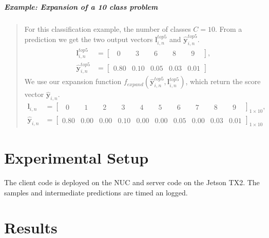 \subparagraph{Example: Expansion of a 10 class problem} 
\blockquote[]{	 	
	For this classification example, the number of classes $C=10$. From a prediction we get the two output vectors $\mathbf{l}_{i,n}^{top5}$ and $ \mathbf{\hat{y}}_{i,n}^{top5}$.
	\begin{align*}
	\mathbf{l}_{i,n}^{top5} &= \begin{bmatrix}
	\phantom{0}0\phantom{.0} & \phantom{0}3\phantom{.0} & \phantom{0}6\phantom{.0} & \phantom{0}8\phantom{.0} & \phantom{0}9\phantom{.0}
	\end{bmatrix},\\
	\mathbf{\hat{y}}_{i,n}^{top5} &= \begin{bmatrix}
	0.80 & 0.10 & 0.05 & 0.03 & 0.01
	\end{bmatrix}
	\end{align*}
	We use our expansion function $ f_{expand}\left(\bm{\hat{y}}_{i,n}^{top5},\mathbf{l}_{i,n}^{top5}\right) $, which return the score vector $ \mathbf{\hat{y}}_{i,n}$.
	\begin{align*}
	\mathbf{l}_{i,n} &= \begin{bmatrix}
	\phantom{0}0\phantom{.0} & \phantom{0}1\phantom{.0} & \phantom{0}2\phantom{.0} & \phantom{0}3\phantom{.0} & \phantom{0}4\phantom{.0} & \phantom{0}5\phantom{.0} & \phantom{0}6\phantom{.0} & \phantom{0}7\phantom{.0} & \phantom{0}8\phantom{.0} & \phantom{0}9\phantom{.0}
	\end{bmatrix}_{1 \times 10},\\
	\mathbf{\hat{y}}_{i,n}  &= \begin{bmatrix}
	0.80 & 0.00 & 0.00 & 0.10 & 0.00 & 0.00 & 0.05 & 0.00 & 0.03 & 0.01
	\end{bmatrix}_{1 \times 10}
	\end{align*}
}      

\section{Experimental Setup} \label{sec:edge-exp-setup}

The client code is deployed on the NUC and server code on the Jetson TX2. The samples and intermediate predictions are timed an logged. 

\section{Results} \label{sec:edge-results}

